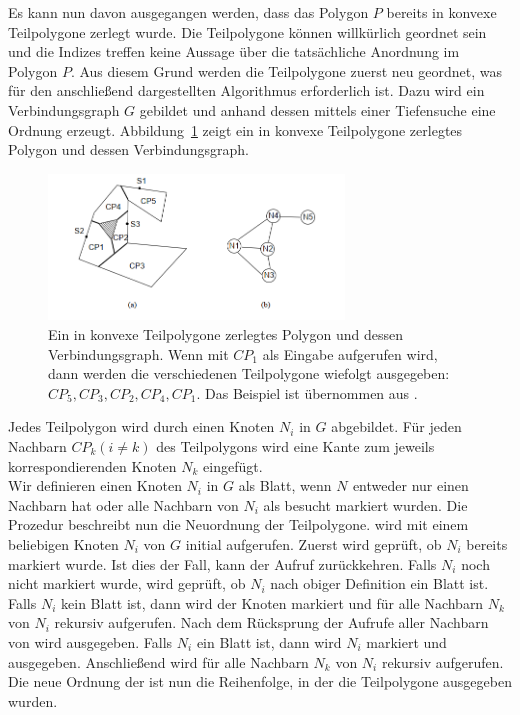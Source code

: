 \documentclass[ngerman]{seminarbeitrag}
\begin{document}
Es kann nun davon ausgegangen werden, dass das Polygon $P$ bereits in konvexe Teilpolygone \cpp zerlegt wurde. Die Teilpolygone können willkürlich geordnet sein und die Indizes treffen keine Aussage über die tatsächliche Anordnung im Polygon $P$. Aus diesem Grund werden die Teilpolygone zuerst neu geordnet, was für den anschließend dargestellten Algorithmus erforderlich ist. Dazu wird ein Verbindungsgraph $G$ gebildet und anhand dessen mittels einer Tiefensuche eine Ordnung erzeugt. Abbildung~\ref{verbindungsgraph} zeigt ein in konvexe Teilpolygone zerlegtes Polygon und dessen Verbindungsgraph.
\begin{figure}[h]
    \includegraphics[width=0.70\textwidth]{./Abbildungen/6.png}
    \centering
    \caption{Ein in konvexe Teilpolygone zerlegtes Polygon und dessen Verbindungsgraph. Wenn \ord mit $CP_{1}$ als Eingabe aufgerufen wird, dann werden die verschiedenen Teilpolygone wiefolgt ausgegeben: $CP_{5},CP_{3},CP_{2},CP_{4},CP_{1}$. Das Beispiel ist übernommen aus \cite{Hert.1998}.}
    \label{verbindungsgraph}
\end{figure}
Jedes Teilpolygon \cpi wird durch einen Knoten $N_{i}$ in $G$ abgebildet. Für jeden Nachbarn $CP_{k} (i \ne k)$ des Teilpolygons \cpi wird eine Kante zum jeweils korrespondierenden Knoten $N_{k}$ eingefügt. \\
Wir definieren einen Knoten $N_{i}$ in $G$ als Blatt, wenn $N_{}$ entweder nur einen Nachbarn hat oder alle Nachbarn von $N_{i}$ als besucht markiert wurden.
Die Prozedur \ord beschreibt nun die Neuordnung der Teilpolygone. \ord wird mit einem beliebigen Knoten $N_{i}$ von $G$ initial aufgerufen. Zuerst wird geprüft, ob $N_{i}$ bereits markiert wurde. Ist dies der Fall, kann der Aufruf zurückkehren. Falls $N_{i}$ noch nicht markiert wurde, wird geprüft, ob $N_{i}$ nach obiger Definition ein Blatt ist. Falls $N_{i}$ kein Blatt ist, dann wird der Knoten markiert und für alle Nachbarn $N_{k}$ von $N_{i}$ rekursiv \ord aufgerufen. Nach dem Rücksprung der Aufrufe aller Nachbarn von \cpi wird \cpi ausgegeben. Falls $N_{i}$ ein Blatt ist, dann wird $N_{i}$ markiert und \cpi ausgegeben. Anschließend wird für alle Nachbarn $N_{k}$ von $N_{i}$ rekursiv \ord aufgerufen.
Die neue Ordnung der \cpi ist nun die Reihenfolge, in der die Teilpolygone ausgegeben wurden.
\end{document}
